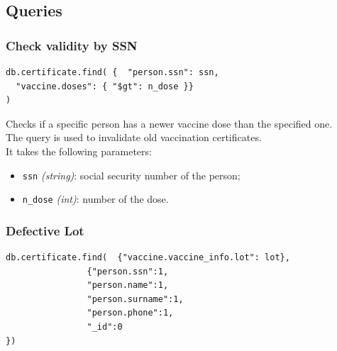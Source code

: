 \documentclass[12pt, a4paper]{article}
\begin{document}
\subsection{Queries}

\subsubsection{Check validity by SSN}
\begin{tcolorbox}[fontupper=\scriptsize]
    \begin{verbatim}
db.certificate.find( {  "person.ssn": ssn,
  "vaccine.doses": { "$gt": n_dose }}
)
    \end{verbatim}
\end{tcolorbox}

\noindent %
Checks if a specific person has a newer vaccine dose than the specified one. \\
The query is used to invalidate old vaccination certificates. \\
It takes the following parameters:
\begin{itemize}
    \item \texttt{ssn} \emph{(string)}: social security number of the person;
    \item \texttt{n\_dose} \emph{(int)}: number of the dose.
\end{itemize}
		
\subsubsection{Defective Lot}
\begin{tcolorbox}[fontupper=\scriptsize]
    \begin{verbatim}
db.certificate.find(  {"vaccine.vaccine_info.lot": lot},
				{"person.ssn":1,
				"person.name":1,
				"person.surname":1,
				"person.phone":1,
				"_id":0
})
    \end{verbatim}
\end{tcolorbox}
\end{document}
